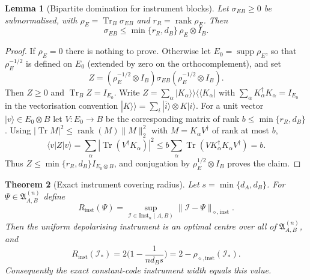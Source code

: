 \documentclass[11pt,a4paper]{article}
\newtheorem{theorem}{Theorem}[section]
\newtheorem{lemma}[theorem]{Lemma}
\newcommand{\Inst}{\mathrm{Inst}}
\newcommand{\Tr}{\operatorname{Tr}}
\newcommand{\supp}{\operatorname{supp}}
\newcommand{\rank}{\operatorname{rank}}
\begin{document}
\begin{lemma}[Bipartite domination for instrument blocks]
\label{lem:domination}
Let $\sigma_{EB}\ge0$ be subnormalised, with $\rho_E=\Tr_B\sigma_{EB}$ and $r_R=\rank\rho_E$. Then
\[
\sigma_{EB}\le\min\{r_R,d_B\}\,\rho_E\otimes I_B.
\]
\end{lemma}

\begin{proof}
If $\rho_E=0$ there is nothing to prove. Otherwise let $E_0=\supp\rho_E$, so that $\rho_E^{-1/2}$ is defined on $E_0$ (extended by zero on the orthocomplement), and set
\[
Z=(\rho_E^{-1/2}\otimes I_B)\sigma_{EB}(\rho_E^{-1/2}\otimes I_B).
\]
Then $Z\ge0$ and $\Tr_BZ=I_{E_0}$. Write $Z=\sum_\alpha|K_\alpha\rangle\!\rangle\langle\!\langle K_\alpha|$ with $\sum_\alpha K_\alpha^\dagger K_\alpha=I_{E_0}$ in the vectorisation convention $|K\rangle\!\rangle=\sum_i|\overline i\rangle\otimes K|i\rangle$. For a unit vector $|v\rangle\in E_0\otimes B$ let $V:E_0\to B$ be the corresponding matrix of rank $b\le\min\{r_R,d_B\}$. Using $|\Tr M|^2\le\rank(M)\|M\|_2^2$ with $M=K_\alpha V^\dagger$ of rank at most $b$,
\[
\langle v|Z|v\rangle
=\sum_\alpha|\Tr(V^\dagger K_\alpha)|^2
\le b\sum_\alpha\Tr(VK_\alpha^\dagger K_\alpha V^\dagger)=b.
\]
Thus $Z\le\min\{r_R,d_B\}I_{E_0\otimes B}$, and conjugation by $\rho_E^{1/2}\otimes I_B$ proves the claim.
\end{proof}

\begin{theorem}[Exact instrument covering radius]
\label{thm:covering}
Let $s=\min\{d_A,d_B\}$. For $\Psi\in\mathfrak A_{A,B}^{(n)}$ define
\[
R_{\mathrm{inst}}(\Psi)=\sup_{\mathcal I\in\Inst_n(A,B)}\|\mathcal I-\Psi\|_{\diamond,\mathrm{inst}}.
\]
Then the uniform depolarising instrument is an optimal centre over all of $\mathfrak A_{A,B}^{(n)}$, and
\[
R_{\mathrm{inst}}(\mathcal I_*)=2\Big(1-\frac1{nd_Bs}\Big)=2-\rho_{\diamond,\mathrm{inst}}(\mathcal I_*).
\]
Consequently the exact constant-code instrument width equals this value.
\end{theorem}
\end{document}
